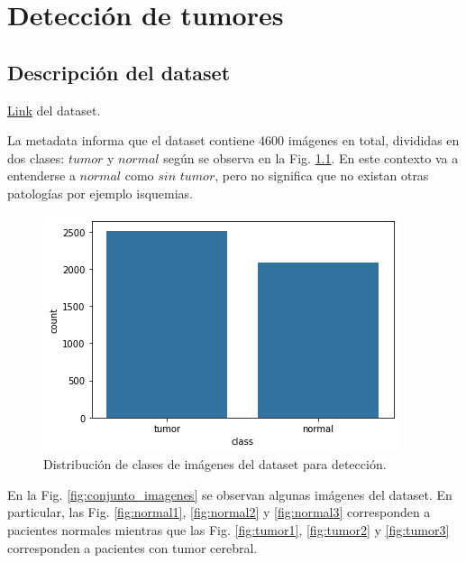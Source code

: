 
\chapter{Detección de tumores}

\section{Descripción del dataset}

\href{https://www.kaggle.com/datasets/preetviradiya/brian-tumor-dataset/data} {Link} del dataset. 

La metadata informa que el dataset contiene 4600 imágenes en total, divididas en dos clases: $tumor$ y $normal$ según se observa en la Fig. \ref{fig.clases}. En este contexto va a entenderse a $normal$ como $sin$ $tumor$, pero no significa que no existan otras patologías por ejemplo isquemias.

\begin{figure}[H]
\centering
        \includegraphics[width=0.5\linewidth]{chapters/deteccion/images/clases.png}
        \caption{Distribución de clases de imágenes del dataset para detección.}
        \label{fig.clases}
  \end{figure}


En la Fig. \ref{fig:conjunto_imagenes} se observan algunas imágenes del dataset. En particular, las Fig. \ref{fig:normal1}, \ref{fig:normal2} y \ref{fig:normal3} corresponden a pacientes normales mientras que las Fig. \ref{fig:tumor1}, \ref{fig:tumor2} y \ref{fig:tumor3} corresponden a pacientes con tumor cerebral. 

